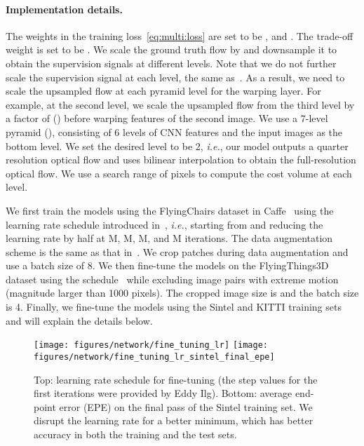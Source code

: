 \documentclass[10pt,journal,cspaper,compsoc]{IEEEtran}
\def\ie{\emph{i.e.}\xspace} \def\Ie{\emph{I.e.}\xspace}
\begin{document}
	\paragraph{Implementation details.}
	The weights in the training loss~\eqref{eq:multi:loss} are set to be , and . 
	The trade-off weight  is set to be .
	We scale the ground truth flow by  and downsample it to obtain the supervision signals at different levels. Note that we do not further scale the supervision signal at each level, the same as~\cite{Dosovitskiy:2015Flownet}.  As a result, we need to scale the upsampled flow at each pyramid level for the warping layer. For example, at the second level, we scale the upsampled flow from the third level by a factor of  () before warping features of the second image.  
	We use a 7-level pyramid (), consisting of 6 levels of CNN features and the input images as the bottom level. We set the desired level  to be 2, \ie, our model outputs a quarter resolution optical flow and uses bilinear interpolation to obtain the full-resolution optical flow.  	We use a search range of  pixels to compute the cost volume at each level. 
	
	
	We first train the models using the FlyingChairs dataset in Caffe~\cite{jia2014caffe} using the  learning rate schedule introduced in~\cite{Ilg:2016:Flownet2}, \ie, starting from  and reducing the learning rate by half at M, M, M, and M iterations. The data augmentation scheme is the same as that in~\cite{Ilg:2016:Flownet2}. We crop  patches during data augmentation and use a batch size of 8. We then fine-tune the models on the FlyingThings3D dataset using the  schedule~\cite{Ilg:2016:Flownet2} while excluding image pairs with extreme motion (magnitude larger than 1000 pixels).  The cropped image size is   and the batch size is 4. Finally, we fine-tune the models using the Sintel and KITTI training sets and will explain the details below. 
	
		
	\begin{figure}[h]
		\begin{center}	
			\texttt{[image: figures/network/fine\_tuning\_lr]} 
			\texttt{[image: figures/network/fine\_tuning\_lr\_sintel\_final\_epe]} 	
		\end{center}
		\caption{Top: learning rate schedule for fine-tuning (the step values for the first  iterations were provided by Eddy Ilg). 
			Bottom: average end-point error (EPE) on the final pass of the Sintel training set. 
			We disrupt the learning rate for a better minimum, which has better accuracy in both the training and the test sets.}
		\label{fig:ft:lr}
	\end{figure}
	
\end{document}
